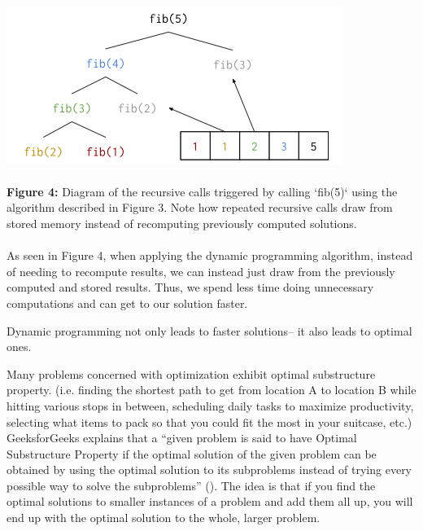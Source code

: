 \documentclass[12pt,letterpaper]{article}
\begin{document}
\paragraph{}
\includegraphics[scale=0.65]{images/fig4fib2.png}
\paragraph{}
\begin{footnotesize}
    \noindent\textbf{Figure 4:} Diagram of the recursive calls triggered by calling `fib(5)` using the algorithm described in Figure 3. Note how repeated recursive calls draw from stored memory instead of recomputing previously computed solutions.
\end{footnotesize}
\paragraph{}

As seen in Figure 4, when applying the dynamic programming algorithm, instead of needing to recompute results, we can instead just draw from the previously computed and stored results. Thus, we spend less time doing unnecessary computations and can get to our solution faster.

Dynamic programming not only leads to faster solutions– it also leads to optimal ones.

Many problems concerned with optimization exhibit optimal substructure property. (i.e. finding the shortest path to get from location A to location B while hitting various stops in between, scheduling daily tasks to maximize productivity, selecting what items to pack so that you could fit the most in your suitcase, etc.) GeeksforGeeks explains that a “given problem is said to have Optimal Substructure Property if the optimal solution of the given problem can be obtained by using the optimal solution to its subproblems instead of trying every possible way to solve the subproblems” (\cite{geeksforgeeks}). The idea is that if you find the optimal solutions to smaller instances of a problem and add them all up, you will end up with the optimal solution to the whole, larger problem.
\end{document}
